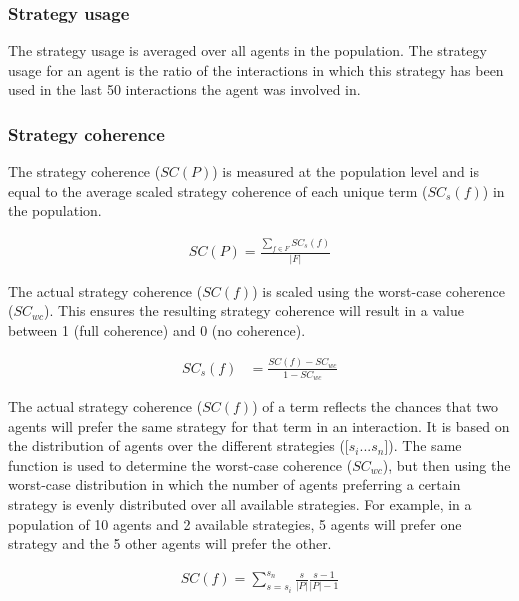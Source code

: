 \subsubsection{Strategy usage}

The strategy usage is averaged over all agents in the population. The
strategy usage for an agent is the ratio of the interactions in which
this strategy has been used in the last 50 interactions the
agent was involved in.

\subsubsection{Strategy coherence}

The strategy coherence ($SC(P)$) is measured at the population level
and is equal to the average scaled strategy coherence of each unique
term ($SC_s(f)$) in the population.

\begin{align}
SC(P) = \frac{\sum_{f \in F} SC_s(f)}{|F|}
\label{e:ls-strategy-coherence-population}
\end{align}

The actual strategy coherence ($SC(f)$) is scaled using the worst-case
coherence ($SC_{wc}$). This ensures the resulting strategy coherence
will result in a value between 1 (full coherence) and 0 (no
coherence).

\begin{align}
SC_s(f) &= \frac{SC(f) - SC_{wc}}{1 - SC_{wc}}
\end{align}

The actual strategy coherence ($SC(f)$) of a term reflects the chances
that two agents will prefer the same strategy for that term in an
interaction. It is based on the distribution of agents over the
different strategies ([$s_i ... s_n$]). The same function is used to
determine the worst-case coherence ($SC_{wc}$), but then using the
worst-case distribution in which the number of agents preferring a
certain strategy is evenly distributed over all available
strategies. For example, in a population of 10 agents and 2 available
strategies, 5 agents will prefer one strategy and the 5 other agents
will prefer the other.

\begin{align}
SC(f) = \sum_{s = s_i}^{s_n}{\frac{s}{|P|}}{\frac{s-1}{|P|-1}}
\end{align}

